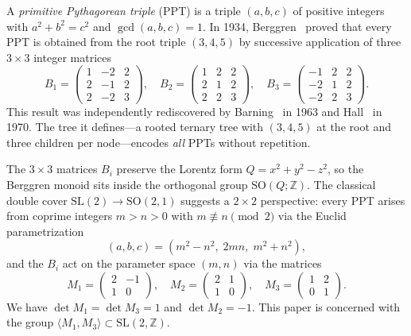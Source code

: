 \documentclass[12pt]{amsart}
\theoremstyle{definition}
\theoremstyle{remark}
\newcommand{\SL}{\mathrm{SL}}
\newcommand{\SO}{\mathrm{SO}}
\newcommand{\Z}{\mathbb{Z}}
\begin{document}
A \emph{primitive Pythagorean triple} (PPT) is a triple $(a,b,c)$ of
positive integers with $a^2+b^2=c^2$ and $\gcd(a,b,c)=1$.  In 1934,
Berggren~\cite{berggren} proved that every PPT is obtained from the root
triple $(3,4,5)$ by successive application of three $3\times 3$ integer
matrices
\begin{equation}\label{eq:berggren3x3}
B_1 = \begin{pmatrix} 1 & -2 & 2\\ 2 & -1 & 2\\ 2 & -2 & 3\end{pmatrix},\quad
B_2 = \begin{pmatrix} 1 & 2 & 2\\ 2 & 1 & 2\\ 2 & 2 & 3\end{pmatrix},\quad
B_3 = \begin{pmatrix} -1 & 2 & 2\\ -2 & 1 & 2\\ -2 & 2 & 3\end{pmatrix}.
\end{equation}
This result was independently rediscovered by Barning~\cite{barning} in
1963 and Hall~\cite{hall} in 1970.  The tree it defines---a rooted ternary
tree with $(3,4,5)$ at the root and three children per node---encodes
\emph{all} PPTs without repetition.

The $3\times3$ matrices $B_i$ preserve the Lorentz form
$Q = x^2+y^2-z^2$, so the Berggren monoid sits inside the orthogonal
group $\SO(Q;\Z)$.  The classical double cover
$\SL(2) \to \SO(2,1)$ suggests a $2\times 2$ perspective: every PPT
arises from coprime integers $m>n>0$ with $m\not\equiv n\pmod{2}$ via
the Euclid parametrization
\[
(a,b,c) = (m^2-n^2,\; 2mn,\; m^2+n^2),
\]
and the $B_i$ act on the parameter space $(m,n)$ via the matrices
\begin{equation}\label{eq:berggren2x2}
M_1 = \begin{pmatrix} 2 & -1\\ 1 & 0\end{pmatrix},\quad
M_2 = \begin{pmatrix} 2 & 1\\ 1 & 0\end{pmatrix},\quad
M_3 = \begin{pmatrix} 1 & 2\\ 0 & 1\end{pmatrix}.
\end{equation}
We have $\det M_1 = \det M_3 = 1$ and $\det M_2 = -1$.  This paper is
concerned with the group $\langle M_1, M_3\rangle \subset \SL(2,\Z)$.
\end{document}
